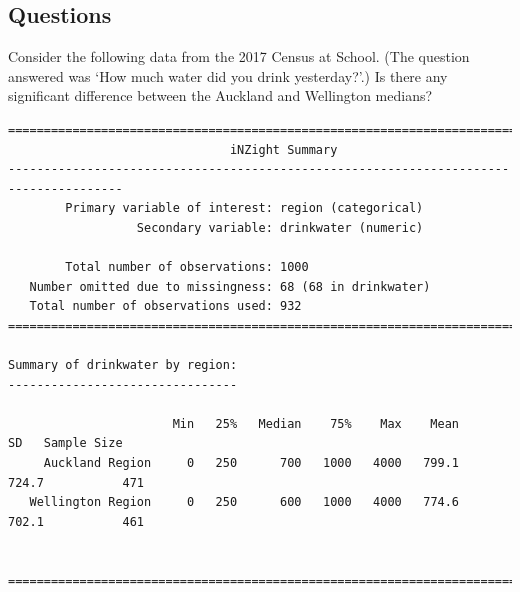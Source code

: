 \subsection*{Questions}
\begin{questions}
  \question Consider the following data from the 2017 Census at School. (The question answered was `How much water did you drink yesterday?'.) Is
            there any significant difference between the Auckland and Wellington medians?
\begin{verbatim}
======================================================================================
                               iNZight Summary
--------------------------------------------------------------------------------------
        Primary variable of interest: region (categorical)
                  Secondary variable: drinkwater (numeric)

        Total number of observations: 1000
   Number omitted due to missingness: 68 (68 in drinkwater)
   Total number of observations used: 932
======================================================================================

Summary of drinkwater by region:
--------------------------------

                       Min   25%   Median    75%    Max    Mean      SD   Sample Size
     Auckland Region     0   250      700   1000   4000   799.1   724.7           471
   Wellington Region     0   250      600   1000   4000   774.6   702.1           461


======================================================================================
\end{verbatim}


\end{questions}
